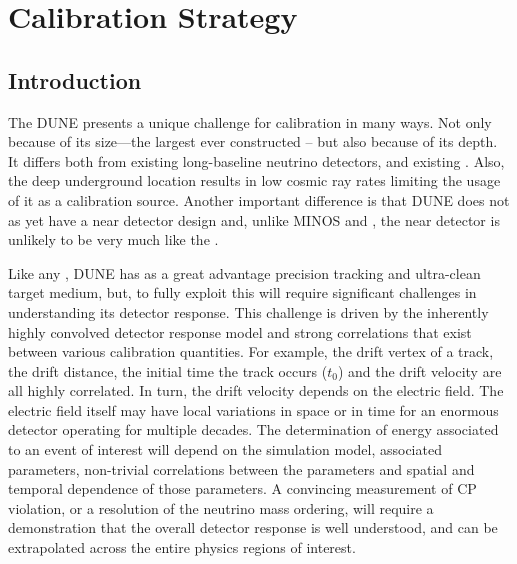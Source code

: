 \chapter{Calibration Strategy}
\label{ch:exec-summ-calib}

\section{Introduction}
\label{sec:calibintro} %


The DUNE  presents a unique challenge for calibration in many ways. Not only because of its size---the largest  ever constructed -- but also because of its depth. It differs both from existing long-baseline neutrino detectors, and existing . Also, the deep underground location results in low cosmic ray rates limiting the usage of it as a calibration source. Another important difference is that DUNE does not as yet have a near detector design and, unlike MINOS and , the near detector is unlikely to be very much like the .

Like any , DUNE has as a great advantage precision tracking and ultra-clean target medium, but, to fully exploit this will require significant challenges in understanding its detector response. This challenge is driven by the inherently highly convolved detector response model and strong correlations that exist between various calibration quantities. For example, the
drift vertex of a track, the drift distance, the initial time the track occurs ($t_0$) and the drift velocity are all highly correlated. In turn, the drift velocity depends on the electric field. The electric field itself may have local variations in space or in time for an enormous detector operating for multiple decades.
The determination of energy associated to an event of interest will depend on the simulation model, associated parameters, non-trivial correlations between the parameters and spatial and temporal dependence of those parameters. A convincing measurement of CP violation, or a resolution of the neutrino mass ordering, will require a demonstration that the overall detector response is well understood, and can be extrapolated across the entire physics regions of interest.

